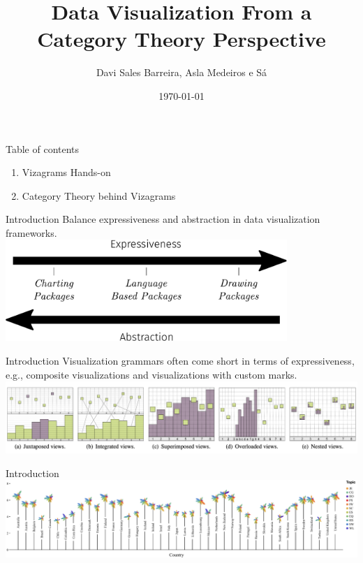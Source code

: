 \documentclass[aspectratio=169,xcolor=dvipsnames,10pt]{beamer}
\title{Data Visualization From a Category Theory Perspective}
\subtitle{}
\author{Davi Sales Barreira, Asla Medeiros e Sá}
\institute
{
    FGV - EMAp, IMPATech
}
\date{\today} %
\theoremstyle{definition}
\begin{document}
\begin{frame}
    \titlepage
\end{frame}

\begin{frame}{Table of contents}
    \begin{enumerate}
        \item Vizagrams Hands-on
        \item Category Theory behind Vizagrams
    \end{enumerate}
\end{frame}

\begin{frame}{Introduction}
    \centering
    Balance expressiveness and abstraction in data visualization frameworks.
    \\[1em]
    \includegraphics[width=0.8\textwidth]{./figures/expressiveness.pdf}
\end{frame}

\begin{frame}{Introduction}
    \centering
    Visualization grammars often come short in terms of expressiveness, e.g., composite visualizations and visualizations with custom marks.
    \\[1em]
    \includegraphics[width=\textwidth]{figs/compvis.png}
\end{frame}

\begin{frame}{Introduction}
    \centering
    \includegraphics[width=\textwidth]{./figs/moritz.pdf}
\end{frame}
\end{document}
